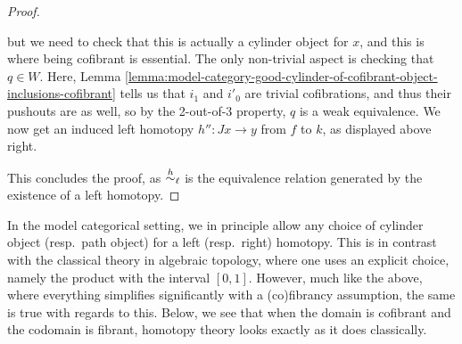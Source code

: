 \begin{proof}
\begin{enumerate}[label=(\arabic*)]
	but we need to check that this is actually a cylinder object for \(x\), and this is where being cofibrant is essential. The only non-trivial aspect is checking that \(q\in W\). Here,
	Lemma \ref{lemma:model-category-good-cylinder-of-cofibrant-object-inclusions-cofibrant} tells us that \(i_1\) and \(i'_0\) are trivial cofibrations, and thus their pushouts are
	as well, so by the 2-out-of-3 property, \(q\) is a weak equivalence. We now get an induced left homotopy \(h''\!:Jx\to y\) from \(f\) to \(k\), as displayed above right.
\end{enumerate}
This concludes the proof, as \(\overset{h}{\sim}_\ell\) is the equivalence relation generated by the existence of a left homotopy.
\end{proof}

In the model categorical setting, we in principle allow any choice of cylinder object (resp.\ path object) for a left (resp.\ right) homotopy. This is
in contrast with the classical theory in algebraic topology, where one uses an explicit choice, namely the product with the interval \([0,1]\). However,
much like the above, where everything simplifies significantly with a (co)fibrancy assumption, the same is true with regards to this. Below, we see that
when the domain is cofibrant and the codomain is fibrant, homotopy theory looks exactly as it does classically.

